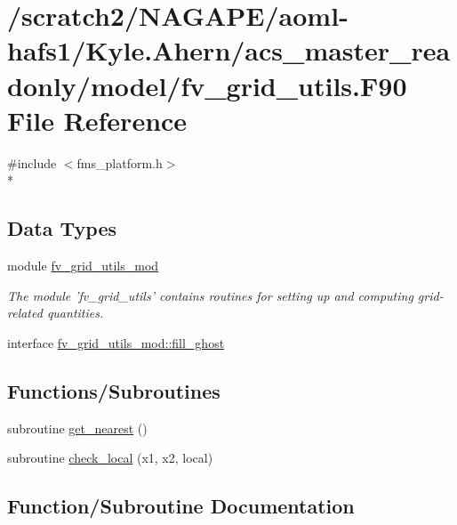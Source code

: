 \section{/scratch2/\-N\-A\-G\-A\-P\-E/aoml-\/hafs1/\-Kyle.Ahern/acs\-\_\-master\-\_\-readonly/model/fv\-\_\-grid\-\_\-utils.F90 File Reference}
\label{fv__grid__utils_8F90}
{\ttfamily \#include $<$fms\-\_\-platform.\-h$>$}\\*
\subsection*{Data Types}
\begin{DoxyCompactItemize}
\item 
module \hyperlink{classfv__grid__utils__mod}{fv\-\_\-grid\-\_\-utils\-\_\-mod}
\begin{DoxyCompactList}\small\item\em The module 'fv\-\_\-grid\-\_\-utils' contains routines for setting up and computing grid-\/related quantities. \end{DoxyCompactList}\item 
interface \hyperlink{interfacefv__grid__utils__mod_1_1fill__ghost}{fv\-\_\-grid\-\_\-utils\-\_\-mod\-::fill\-\_\-ghost}
\end{DoxyCompactItemize}
\subsection*{Functions/\-Subroutines}
\begin{DoxyCompactItemize}
\item 
subroutine \hyperlink{fv__grid__utils_8F90_a44ab7367698357893ac8e593951be4e5}{get\-\_\-nearest} ()
\item 
subroutine \hyperlink{fv__grid__utils_8F90_ad57368c80b3a6eb85246900731f30e9a}{check\-\_\-local} (x1, x2, local)
\end{DoxyCompactItemize}


\subsection{Function/\-Subroutine Documentation}
